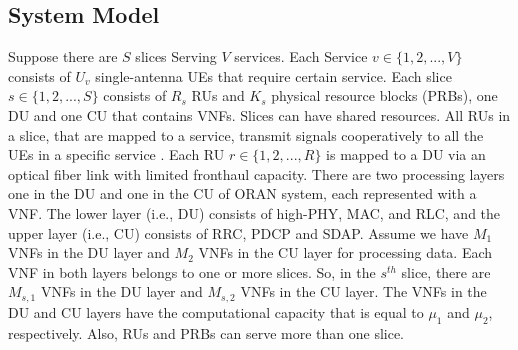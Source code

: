 \documentclass[conference]{IEEEtran}
\begin{document}
\subsection{System Model}
Suppose there are $S$ slices Serving $V$ services. Each Service $v\in \{1,2,...,V \} $ consists of $U_v$
single-antenna UEs that require certain service. Each slice $s \in \{1,2,...,S \}$ consists of $R_s$ RUs and $K_s$ physical resource blocks (PRBs), one DU and one CU that contains VNFs.
Slices can have shared resources. All RUs in a slice, that are mapped to a service, transmit signals cooperatively to all the UEs in a specific service \cite{motalleb2017optimal,mimoCran}. Each RU $r \in \{1,2,...,R \}$ is mapped to a DU via an optical fiber link with limited fronthaul capacity.
There are two processing layers one in the DU and one in the CU of ORAN system, each represented with a VNF. The lower layer (i.e., DU) consists of high-PHY, MAC, and RLC, and the upper layer (i.e., CU) consists of RRC, PDCP and SDAP. Assume we have $M_1$ VNFs in the DU layer and $M_2$ VNFs in the CU layer for processing data.
Each VNF in both layers belongs to one or more slices. So, in the $s^{th}$ slice, there are $M_{s,1}$ VNFs in the DU layer and $M_{s,2}$ VNFs in the CU layer. The VNFs in the DU and CU layers have the computational capacity that is  equal to $\mu_1$ and $\mu_2$, respectively.
Also, RUs and PRBs can serve more than one slice.
\end{document}
